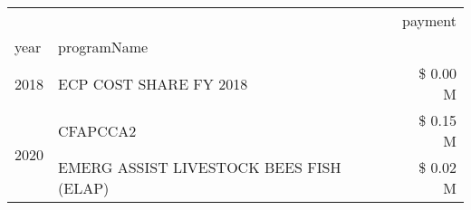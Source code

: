 \begin{tabular}{llr}
\toprule
 &  & payment \\
year & programName &  \\
\midrule
2018 & ECP COST SHARE FY 2018 & \$ 0.00 M \\
\cline{1-3}
\multirow[t]{2}{*}{2020} & CFAPCCA2 & \$ 0.15 M \\
 & EMERG ASSIST LIVESTOCK BEES FISH (ELAP) & \$ 0.02 M \\
\cline{1-3}
\bottomrule
\end{tabular}
